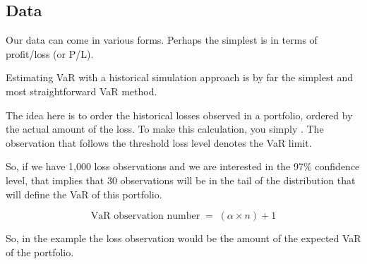 \subsection{Data}
Our data can come in various forms. Perhaps the simplest is in terms of profit/loss (or P/L).


Estimating VaR with a historical simulation approach is by far the simplest and most
straightforward VaR method.

The idea here is to order the historical losses observed in a portfolio, ordered by the actual
amount of the loss. To make this calculation, you simply . The observation that follows the threshold loss level denotes the VaR limit.

So, if we have 1,000 loss observations and we are interested in the 97\% confidence level,
that implies that 30 observations will be in the tail of the distribution that will define the
VaR of this portfolio.

\begin{mrfmlbox}
\[ \text{VaR observation number} \;=\; (\alpha \times n) + 1 \]
\end{mrfmlbox}

So, in the example the  loss observation would be the amount of the expected VaR of
the portfolio.

